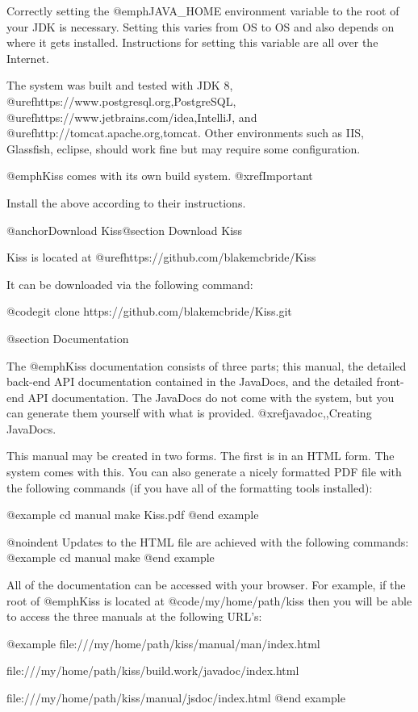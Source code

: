 Correctly setting the @emph{JAVA_HOME} environment variable to the root of your
JDK is necessary.  Setting this varies from OS to OS and also depends on where it
gets installed.  Instructions for setting this variable are all over the Internet.

The system was built and tested with JDK 8,
@uref{https://www.postgresql.org,PostgreSQL},
@uref{https://www.jetbrains.com/idea,IntelliJ}, and
@uref{http://tomcat.apache.org,tomcat}.  Other environments such as
IIS, Glassfish, eclipse, should work fine but may require some
configuration.

@emph{Kiss} comes with its own build system.  @xref{Important}

Install the above according to their instructions.

@anchor{Download Kiss}@section Download Kiss

Kiss is located at @uref{https://github.com/blakemcbride/Kiss}

It can be downloaded via the following command:

@code{git clone https://github.com/blakemcbride/Kiss.git}

@section Documentation

The @emph{Kiss} documentation consists of three parts; this manual,
the detailed back-end API documentation contained in the JavaDocs, and
the detailed front-end API documentation.  The JavaDocs do not come
with the system, but you can generate them yourself with what is
provided.  @xref{javadoc,,Creating JavaDocs}.

This manual may be created in two forms.  The first is in an HTML
form.  The system comes with this.  You can also generate a nicely
formatted PDF file with the following commands (if you have all of the
formatting tools installed):

@example
cd manual
make Kiss.pdf
@end example

@noindent
Updates to the HTML file are achieved with the following commands:
@example
cd manual
make
@end example

All of the documentation can be accessed with your browser.  For
example, if the root of @emph{Kiss} is located at
@code{/my/home/path/kiss} then you will be able to access the three
manuals at the following URL's:

@example
file:///my/home/path/kiss/manual/man/index.html

file:///my/home/path/kiss/build.work/javadoc/index.html

file:///my/home/path/kiss/manual/jsdoc/index.html
@end example

